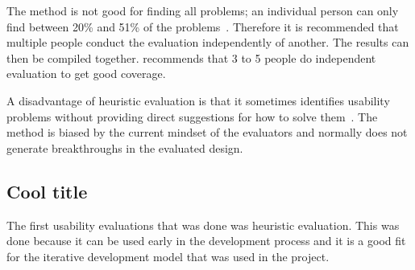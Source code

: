 The method is not good for finding all problems; an individual person can only find between 20\% and 51\% of the problems~\cite{Nielsen1990}. Therefore it is recommended that multiple people conduct the evaluation independently of another. The results can then be compiled together. \cite{Nielsen1990} recommends that 3 to 5 people do independent evaluation to get good coverage.

A disadvantage of heuristic evaluation is that it sometimes identifies usability problems without providing direct suggestions for how to solve them~\cite{Nielsen1990}. The method is biased by the current mindset of the evaluators and normally does not generate breakthroughs in the evaluated design.

\subsection{Cool title}
The first usability evaluations that was done was heuristic evaluation. This was done because it can be used early in the development process and it is a good fit for the iterative development model that was used in the project.
